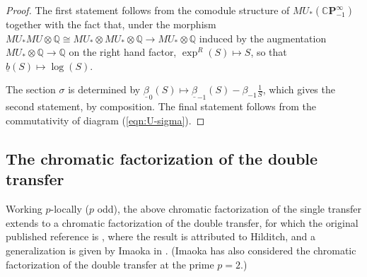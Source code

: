 \documentclass[10pt,a4paper]{amsart}
\theoremstyle{definition}
\theoremstyle{remark}
\newcommand{\rat}{\mathbb{Q}}
\newcommand{\cp}{\mathbb{C} \mathbf{P}^\infty}
\begin{document}
\begin{proof}
	 The first statement  follows from the comodule structure of $MU_*(\cp_{-1})$ together with the fact that,
under the morphism $MU_* MU \otimes \rat \cong MU_* \otimes MU_*
\otimes \rat \rightarrow MU_* \otimes \rat$ induced by the augmentation $MU_*
\otimes \rat \rightarrow \rat$ on the right hand factor, $\exp^R (S) \mapsto
S$, so that $\underline{b} (S) \mapsto \log (S)$.

The section $\sigma$ is determined by $\underline{\beta}_0 (S) \mapsto \underline{\beta}_{-1} (S) - \beta_{-1}\frac{1}{S}$, which gives the second statement, by composition. The final statement follows from the commutativity of diagram (\ref{eqn:U-sigma}).
\end{proof}

\subsection{The chromatic factorization of the double transfer}



Working $p$-locally ($p$ odd), the above chromatic factorization of the single transfer extends to a chromatic factorization of the double transfer, for which the original published reference is  \cite[Theorem 5.2]{BCGHRW}, where the result is attributed to Hilditch,  and a generalization is given by Imaoka in \cite{imaoka}. (Imaoka \cite{imaoka_p2} has also considered the chromatic factorization of the double transfer at the prime $p=2$.)
\end{document}
